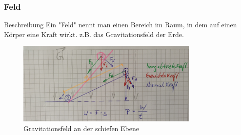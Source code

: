 \documentclass{article}
\begin{document}
\frame
{
  \frametitle{Feld}
\begin{block}{Beschreibung}
Ein "Feld" nennt man einen Bereich im Raum, in dem auf einen Körper eine Kraft wirkt. z.B. das Gravitationsfeld der Erde.
\end{block}
      \begin{figure}
	  \includegraphics[width=0.8\textwidth]{Feld}
	  \vspace{-3mm}
	  \caption{Gravitationsfeld an der schiefen Ebene}
   \end{figure}
}
\end{document}
